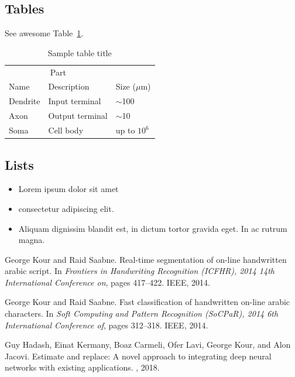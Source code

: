 \documentclass{article}
\begin{document}
\subsection{Tables}
\lipsum[12]
See awesome Table~\ref{tab:table}.

\begin{table}
  \caption{Sample table title}
  \centering
  \begin{tabular}{lll}
    \toprule
    \multicolumn{2}{c}{Part}                   \\
    \cmidrule(r){1-2}
    Name     & Description     & Size ($\mu$m) \\
    \midrule
    Dendrite & Input terminal  & $\sim$100     \\
    Axon     & Output terminal & $\sim$10      \\
    Soma     & Cell body       & up to $10^6$  \\
    \bottomrule
  \end{tabular}
  \label{tab:table}
\end{table}

\subsection{Lists}
\begin{itemize}
  \item Lorem ipsum dolor sit amet
  \item consectetur adipiscing elit.
  \item Aliquam dignissim blandit est, in dictum tortor gravida eget. In ac rutrum magna.
\end{itemize}





\begin{thebibliography}{1}

  George Kour and Raid Saabne.
  \newblock Real-time segmentation of on-line handwritten arabic script.
  \newblock In {\em Frontiers in Handwriting Recognition (ICFHR), 2014 14th
      International Conference on}, pages 417--422. IEEE, 2014.

  George Kour and Raid Saabne.
  \newblock Fast classification of handwritten on-line arabic characters.
  \newblock In {\em Soft Computing and Pattern Recognition (SoCPaR), 2014 6th
      International Conference of}, pages 312--318. IEEE, 2014.

  Guy Hadash, Einat Kermany, Boaz Carmeli, Ofer Lavi, George Kour, and Alon
  Jacovi.
  \newblock Estimate and replace: A novel approach to integrating deep neural
  networks with existing applications.
  , 2018.

\end{thebibliography}
\end{document}
